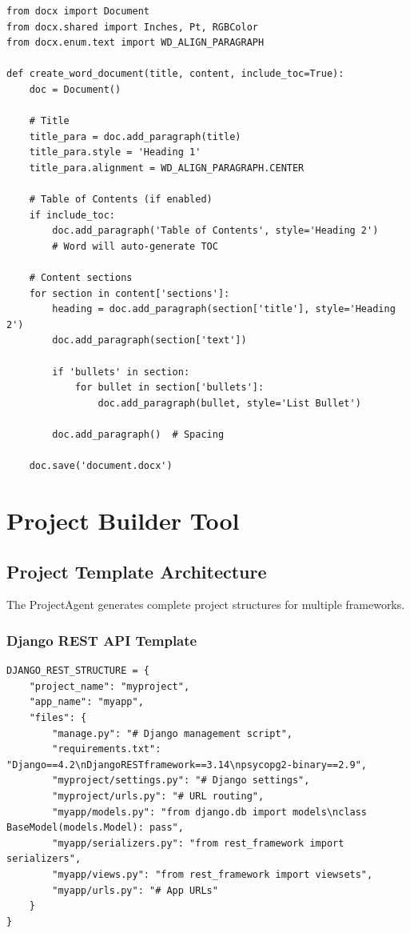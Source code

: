 \documentclass{report}
\begin{document}
\begin{lstlisting}
from docx import Document
from docx.shared import Inches, Pt, RGBColor
from docx.enum.text import WD_ALIGN_PARAGRAPH

def create_word_document(title, content, include_toc=True):
    doc = Document()
    
    # Title
    title_para = doc.add_paragraph(title)
    title_para.style = 'Heading 1'
    title_para.alignment = WD_ALIGN_PARAGRAPH.CENTER
    
    # Table of Contents (if enabled)
    if include_toc:
        doc.add_paragraph('Table of Contents', style='Heading 2')
        # Word will auto-generate TOC
    
    # Content sections
    for section in content['sections']:
        heading = doc.add_paragraph(section['title'], style='Heading 2')
        doc.add_paragraph(section['text'])
        
        if 'bullets' in section:
            for bullet in section['bullets']:
                doc.add_paragraph(bullet, style='List Bullet')
        
        doc.add_paragraph()  # Spacing
    
    doc.save('document.docx')
\end{lstlisting}

\chapter{Project Builder Tool}

\section{Project Template Architecture}

The ProjectAgent generates complete project structures for multiple frameworks.

\subsection{Django REST API Template}

\begin{lstlisting}
DJANGO_REST_STRUCTURE = {
    "project_name": "myproject",
    "app_name": "myapp",
    "files": {
        "manage.py": "# Django management script",
        "requirements.txt": "Django==4.2\nDjangoRESTframework==3.14\npsycopg2-binary==2.9",
        "myproject/settings.py": "# Django settings",
        "myproject/urls.py": "# URL routing",
        "myapp/models.py": "from django.db import models\nclass BaseModel(models.Model): pass",
        "myapp/serializers.py": "from rest_framework import serializers",
        "myapp/views.py": "from rest_framework import viewsets",
        "myapp/urls.py": "# App URLs"
    }
}
\end{lstlisting}
\end{document}
